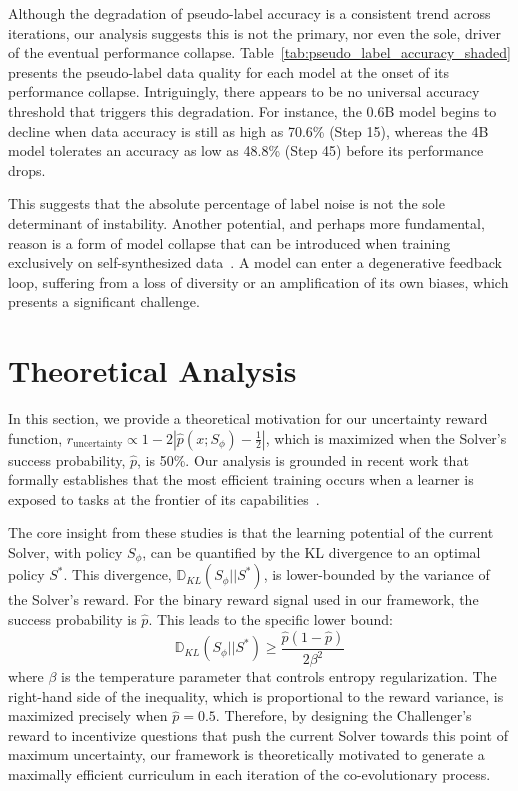 Although the degradation of pseudo-label accuracy is a consistent trend across iterations, our analysis suggests this is not the primary, nor even the sole, driver of the eventual performance collapse. Table~\ref{tab:pseudo_label_accuracy_shaded} presents the pseudo-label data quality for each model at the onset of its performance collapse. Intriguingly, there appears to be no universal accuracy threshold that triggers this degradation. For instance, the 0.6B model begins to decline when data accuracy is still as high as 70.6\% (Step 15), whereas the 4B model tolerates an accuracy as low as 48.8\% (Step 45) before its performance drops.

This suggests that the absolute percentage of label noise is not the sole determinant of instability. Another potential, and perhaps more fundamental, reason is a form of model collapse that can be introduced when training exclusively on self-synthesized data~\citep{tan2024large,Shumailov2024AIMC,Dohmatob2024ATO,zhou2025dissecting,Seddik2024HowBI,Dohmatob2024StrongMC,Briesch2023LargeLM,zheng2025learning}. A model can enter a degenerative feedback loop, suffering from a loss of diversity or an amplification of its own biases, which presents a significant challenge.

\section{Theoretical Analysis}
\label{sec:theoretical_analysis}

In this section, we provide a theoretical motivation for our uncertainty reward function, $r_{\text{uncertainty}} \propto 1 - 2|\hat{p}(x; S_{\phi}) - \tfrac{1}{2}|$, which is maximized when the Solver's success probability, $\hat{p}$, is 50\%. Our analysis is grounded in recent work that formally establishes that the most efficient training occurs when a learner is exposed to tasks at the frontier of its capabilities~\citep{Shi2025EfficientRF, Bae2025OnlineDF}.

The core insight from these studies is that the learning potential of the current Solver, with policy $S_\phi$, can be quantified by the KL divergence to an optimal policy $S^*$. This divergence, $\mathbb{D}_{KL}(S_\phi || S^*)$, is lower-bounded by the variance of the Solver's reward. For the binary reward signal used in our framework, the success probability is $\hat{p}$. This leads to the specific lower bound:
\[
\mathbb{D}_{KL}(S_\phi || S^*) \ge \frac{\hat{p}(1 - \hat{p})}{2\beta^2}
\]
where $\beta$ is the temperature parameter that controls entropy regularization. The right-hand side of the inequality, which is proportional to the reward variance, is maximized precisely when $\hat{p} = 0.5$. 
Therefore, by designing the Challenger's reward to incentivize questions that push the current Solver towards this point of maximum uncertainty, our framework is theoretically motivated to generate a maximally efficient curriculum in each iteration of the co-evolutionary process.
\newpage
